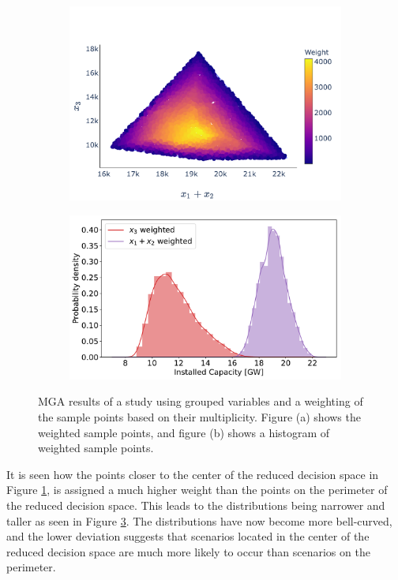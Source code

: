 \begin{figure}[H]\centering
	\begin{subfigure}{.48\textwidth} \centering
		\includegraphics[width=1.\textwidth]{./Images/multi_4}
		\caption{}
		\label{fig:multi_4}
	\end{subfigure}
	\begin{subfigure}{.48\textwidth} \centering
		\includegraphics[width=1.\textwidth]{./Images/multi_5}
		\caption{}
		\label{fig:multi_5}
	\end{subfigure}
	\caption{MGA results of a study using grouped variables and a weighting of the sample points based on their multiplicity. Figure (a) shows the weighted sample points, and figure (b) shows a histogram of weighted sample points.}
\end{figure}

It is seen how the points closer to the center of the reduced decision space in Figure \ref{fig:multi_4}, is assigned a much higher weight than the points on the perimeter of the reduced decision space. This leads to the distributions being narrower and taller as seen in Figure \ref{fig:multi_5}. The distributions have now become more bell-curved, and the lower deviation suggests that scenarios located in the center of the reduced decision space are much more likely to occur than scenarios on the perimeter. 

